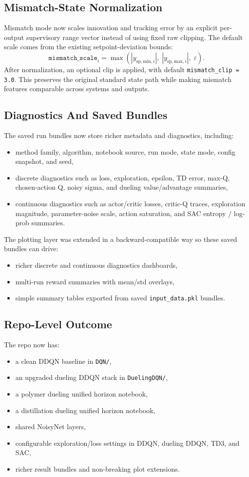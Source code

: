 \subsection{Mismatch-State Normalization}
Mismatch mode now scales innovation and tracking error by an explicit per-output supervisory range vector instead of using fixed raw clipping. The default scale comes from the existing setpoint-deviation bounds:
\[
\texttt{mismatch\_scale}_i = \max\!\left(|y_{\mathrm{sp,min},i}|,\; |y_{\mathrm{sp,max},i}|,\; \varepsilon\right).
\]
After normalization, an optional clip is applied, with default \texttt{mismatch\_clip = 3.0}. This preserves the original standard state path while making mismatch features comparable across systems and outputs.

\subsection{Diagnostics And Saved Bundles}
The saved run bundles now store richer metadata and diagnostics, including:
\begin{itemize}
  \item method family, algorithm, notebook source, run mode, state mode, config snapshot, and seed,
  \item discrete diagnostics such as loss, exploration, epsilon, TD error, max-Q, chosen-action Q, noisy sigma, and dueling value/advantage summaries,
  \item continuous diagnostics such as actor/critic losses, critic-Q traces, exploration magnitude, parameter-noise scale, action saturation, and SAC entropy / log-prob summaries.
\end{itemize}

The plotting layer was extended in a backward-compatible way so these saved bundles can drive:
\begin{itemize}
  \item richer discrete and continuous diagnostics dashboards,
  \item multi-run reward summaries with mean/std overlays,
  \item simple summary tables exported from saved \texttt{input\_data.pkl} bundles.
\end{itemize}

\subsection{Repo-Level Outcome}
The repo now has:
\begin{itemize}
  \item a clean DDQN baseline in \texttt{DQN/},
  \item an upgraded dueling DDQN stack in \texttt{DuelingDQN/},
  \item a polymer dueling unified horizon notebook,
  \item a distillation dueling unified horizon notebook,
  \item shared NoisyNet layers,
  \item configurable exploration/loss settings in DDQN, dueling DDQN, TD3, and SAC,
  \item richer result bundles and non-breaking plot extensions.
\end{itemize}

